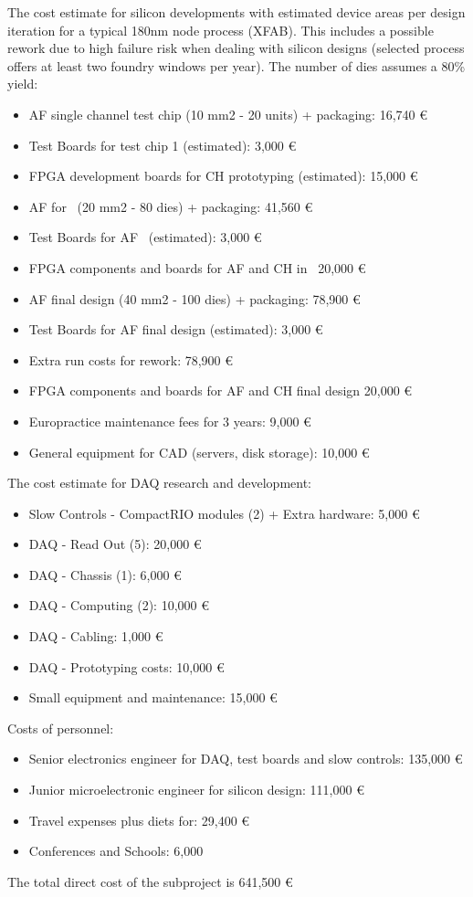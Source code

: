 The cost estimate for silicon developments with estimated device areas per design iteration for a typical 180nm node process (XFAB). This includes a possible rework due to high failure risk when dealing with silicon designs (selected process offers at least two foundry windows per year). The number of dies assumes a 80\% yield:
\begin{itemize}[noitemsep,topsep=0pt,parsep=0pt,partopsep=0pt]
    \item AF single channel test chip (10 mm2 - 20 units) + packaging: 16,740 €
    \item Test Boards for test chip 1 (estimated): 3,000 €
    \item FPGA development boards for CH prototyping (estimated): 15,000 €
    \item AF for \HDEMO\ (20 mm2 - 80 dies) + packaging: 41,560 €
    \item Test Boards for AF \HDEMO\ (estimated): 3,000 €
    \item FPGA components and boards for AF and CH in \HDEMO\ 20,000 €
    \item AF final design (40 mm2 - 100 dies) + packaging: 78,900 €
    \item Test Boards for AF final design (estimated): 3,000 €
    \item Extra run costs for rework: 78,900 €
    \item FPGA components and boards for AF and CH final design 20,000 €
    \item Europractice maintenance fees for 3 years: 9,000 €
    \item General equipment for CAD (servers, disk storage): 10,000 €
\end{itemize}
The cost estimate for DAQ research and development:
\begin{itemize}[noitemsep,topsep=0pt,parsep=0pt,partopsep=0pt]
    \item Slow Controls - CompactRIO modules (2) + Extra hardware: 5,000 €
    \item DAQ - Read Out (5): 20,000 €
    \item DAQ - Chassis (1): 6,000 €
    \item DAQ - Computing (2): 10,000 €
    \item DAQ - Cabling: 1,000 €
    \item DAQ - Prototyping costs: 10,000 €
    \item Small equipment and maintenance: 15,000 €
\end{itemize}
Costs of personnel:
\begin{itemize}[noitemsep,topsep=0pt,parsep=0pt,partopsep=0pt]
    \item Senior electronics engineer for DAQ, test boards and slow controls: 135,000 €
    \item Junior microelectronic engineer for silicon design: 111,000 €
    \item Travel expenses plus diets for: 29,400 €
    \item Conferences and Schools: 6,000
\end{itemize}
The total direct cost of the subproject is 641,500 €

